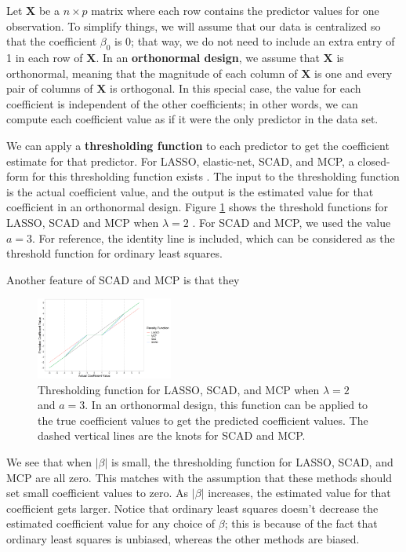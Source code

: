 \documentclass{article}
\begin{document}
Let $\mathbf{X}$ be a $n\times p$ matrix where each row contains the predictor values for one observation. To simplify things, we will assume that our data is centralized so that the coefficient $\beta_0$ is 0; that way, we do not need to include an extra entry of 1 in each row of $\mathbf{X}$. In an \textbf{orthonormal design}, we assume that $\mathbf{X}$ is orthonormal, meaning that the magnitude of each column of $\mathbf{X}$ is one and every pair of columns of $\mathbf{X}$ is orthogonal. In this special case, the value for each coefficient is independent of the other coefficients; in other words, we can compute each coefficient value as if it were the only predictor in the data set.

We can apply a \textbf{thresholding function} to each predictor to get the coefficient estimate for that predictor. For LASSO, elastic-net, SCAD, and MCP, a closed-form for this thresholding function exists \cite{tibshirani1996regression, fan2001variable, zou2005regularization, zhang2010nearly}. The input to the thresholding function is the actual coefficient value, and the output is the estimated value for that coefficient in an orthonormal design. Figure \ref{fig:prediction} shows the threshold functions for LASSO, SCAD and MCP when $\lambda = 2$ . For SCAD and MCP, we used the value $a = 3$. For reference, the identity line is included, which can be considered as the threshold function for ordinary least squares.

Another feature of SCAD and MCP is that they

\begin{figure}[!h]
	\centering
	\includegraphics[width = 0.4\textwidth]{images/lasso-scad-mcp-solution.png}
	\captionsetup{width = 4in}
	\caption{Thresholding function for LASSO, SCAD, and MCP when $\lambda = 2$ and $a = 3$. In an orthonormal design, this function can be applied to the true coefficient values to get the predicted coefficient values. The dashed vertical lines are the knots for SCAD and MCP.}
	\label{fig:prediction}
\end{figure}

We see that when $\vert \beta \vert$ is small, the thresholding function for LASSO, SCAD, and MCP are all zero. This matches with the assumption that these methods should set small coefficient values to zero. As $\vert \beta \vert$ increases, the estimated value for that coefficient gets larger. Notice that ordinary least squares doesn't decrease the estimated coefficient value for any choice of $\beta$; this is because of the fact that ordinary least squares is unbiased, whereas the other methods are biased.
\end{document}
